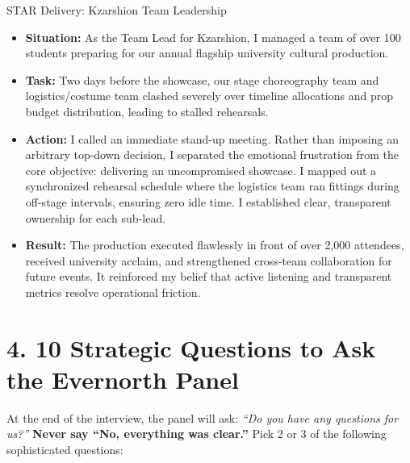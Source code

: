 \documentclass[10pt,a4paper]{article}
\begin{document}
\begin{calloutbox}{STAR Delivery: Kzarshion Team Leadership}
\begin{itemize}[noitemsep]
    \item \textbf{Situation:} As the Team Lead for Kzarshion, I managed a team of over 100 students preparing for our annual flagship university cultural production.
    \item \textbf{Task:} Two days before the showcase, our stage choreography team and logistics/costume team clashed severely over timeline allocations and prop budget distribution, leading to stalled rehearsals.
    \item \textbf{Action:} I called an immediate stand-up meeting. Rather than imposing an arbitrary top-down decision, I separated the emotional frustration from the core objective: delivering an uncompromised showcase. I mapped out a synchronized rehearsal schedule where the logistics team ran fittings during off-stage intervals, ensuring zero idle time. I established clear, transparent ownership for each sub-lead.
    \item \textbf{Result:} The production executed flawlessly in front of over 2,000 attendees, received university acclaim, and strengthened cross-team collaboration for future events. It reinforced my belief that active listening and transparent metrics resolve operational friction.
\end{itemize}
\end{calloutbox}

\section{4. 10 Strategic Questions to Ask the Evernorth Panel}

At the end of the interview, the panel will ask: \textit{``Do you have any questions for us?''} 
\textbf{Never say ``No, everything was clear.''} Pick 2 or 3 of the following sophisticated questions:
\end{document}
